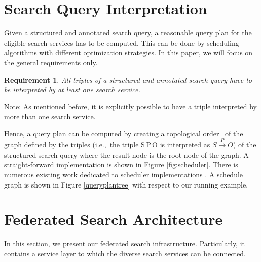 \documentclass{acm_proc_article-sp}
\newtheorem{req}{Requirement}
\newcommand{\ie}{i.e.,~}
\begin{document}
\section{Search Query Interpretation}\label{sec:queryinterpretation}


Given a structured and annotated search query, a rea\-so\-nable query plan for the eligible search services has to be computed.
This can be done by scheduling algorithms with different optimization strategies. 
In this paper, we will focus on the general requirements only.


\begin{req}
All triples of a structured and annotated search query have to be interpreted by at least one search service.
\end{req}
Note: As mentioned before, it is explicitly possible to have a triple interpreted by more than one search service.

Hence, a query plan can be computed by creating a to\-po\-lo\-gi\-cal order \cite{DBLP:books/aw/Knuth81}\ of the graph defined by the triples (\ie the triple S\,P\,O is interpreted as $S \xrightarrow{P} O$) of the structured search query where the result node is the root node of the graph.
A straight-forward implementation is shown in Fi\-gure \ref{fig:scheduler}.
There is numerous existing work dedicated to scheduler implementations \cite{XXX,YYY,ZZZ}.
A schedule graph is shown in Figure \ref{queryplantree} with respect to our running example.


\section{Federated Search Architecture}\label{sec:federated}

In this section, we present our federated search in\-fra\-struc\-ture. 
Particularly, it contains a service layer to which the diverse search services can be connected. 
\end{document}
